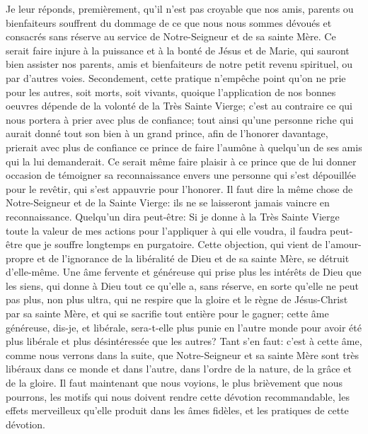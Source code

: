Je leur réponds, premièrement, qu'il n'est pas croyable que nos amis, parents ou bienfaiteurs souffrent du
dommage de ce que nous nous sommes dévoués et consacrés sans réserve au service de Notre-Seigneur et de
sa sainte Mère. Ce serait faire injure à la puissance et à la bonté de Jésus et de Marie, qui sauront bien assister
nos parents, amis et bienfaiteurs de notre petit revenu spirituel, ou par d'autres voies.
Secondement, cette pratique n'empêche point qu'on ne prie pour les autres, soit morts, soit vivants, quoique
l'application de nos bonnes oeuvres dépende de la volonté de la Très Sainte Vierge; c'est au contraire ce qui nous
portera à prier avec plus de confiance; tout ainsi qu'une personne riche qui aurait donné tout son bien à un grand
prince, afin de l'honorer davantage, prierait avec plus de confiance ce prince de faire l'aumône à quelqu'un de ses
amis qui la lui demanderait. Ce serait même faire plaisir à ce prince que de lui donner occasion de témoigner sa
reconnaissance envers une personne qui s'est dépouillée pour le revêtir, qui s'est appauvrie pour l'honorer. Il faut
dire la même chose de Notre-Seigneur et de la Sainte Vierge: ils ne se laisseront jamais vaincre en
reconnaissance.
 Quelqu'un dira peut-être: Si je donne à la Très Sainte Vierge toute la valeur de mes actions pour l'appliquer à
qui elle voudra, il faudra peut-être que je souffre longtemps en purgatoire.
Cette objection, qui vient de l'amour-propre et de l'ignorance de la libéralité de Dieu et de sa sainte Mère, se détruit
d'elle-même. Une âme fervente et généreuse qui prise plus les intérêts de Dieu que les siens, qui donne à Dieu
tout ce qu'elle a, sans réserve, en sorte qu'elle ne peut pas plus, non plus ultra, qui ne respire que la gloire et le
règne de Jésus-Christ par sa sainte Mère, et qui se sacrifie tout entière pour le gagner; cette âme généreuse, dis-je, et libérale, sera-t-elle plus punie en l'autre monde pour avoir été plus libérale et plus désintéressée que les
autres? Tant s'en faut: c'est à cette âme, comme nous verrons dans la suite, que Notre-Seigneur et sa sainte Mère
sont très libéraux dans ce monde et dans l'autre, dans l'ordre de la nature, de la grâce et de la gloire.
 Il faut maintenant que nous voyions, le plus brièvement que nous pourrons, les motifs qui nous doivent
rendre cette dévotion recommandable, les effets merveilleux qu'elle produit dans les âmes fidèles, et les pratiques
de cette dévotion.

